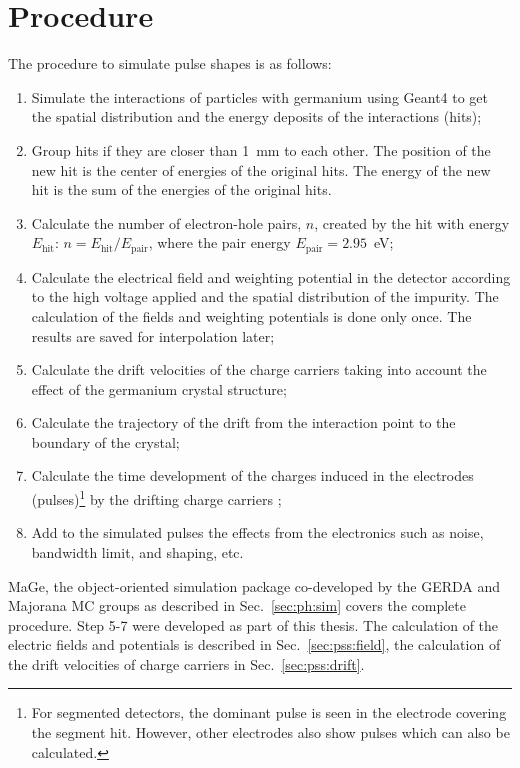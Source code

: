 \section{Procedure}
\label{sec:pss:proc}
The procedure to simulate pulse shapes \cite{agata} is as follows:
\begin{enumerate}
\item Simulate the interactions of particles with germanium using Geant4 to get the spatial distribution and the energy deposits of the interactions (hits);
\item Group hits if they are closer than 1~mm to each other. The position of the new hit is the center of energies of the original hits. The energy of the new hit is the sum of the energies of the original hits.
\item Calculate the number of electron-hole pairs, $n$, created by the hit with energy $E_{\text{hit}}$: $n = E_{\text{hit}} / E_{\text{pair}}$, where the pair energy $E_{\text{pair}} = 2.95$~eV;
\item Calculate the electrical field and weighting potential \cite{Gat82, Rad88, He00} in the detector according to the high voltage applied and the spatial distribution of the impurity. The calculation of the fields and weighting potentials is done only once. The results are saved for interpolation later;
\item Calculate the drift velocities of the charge carriers taking into account the effect of the germanium crystal structure;
\item Calculate the trajectory of the drift from the interaction point to the boundary of the crystal;
\item Calculate the time development of the charges induced in the electrodes (pulses)\footnote{For segmented detectors, the dominant pulse is seen in the electrode covering the segment hit. However, other electrodes also show pulses which can also be calculated.} by the drifting charge carriers \cite{igex}; 
\item Add to the simulated pulses the effects from the electronics such as noise, bandwidth limit, and shaping, etc.
\end{enumerate}
MaGe, the object-oriented simulation package co-developed by the GERDA and Majorana MC groups as described in Sec.~\ref{sec:ph:sim} covers the complete procedure. Step 5-7 were developed as part of this thesis. The calculation of the electric fields and potentials is described in Sec.~\ref{sec:pss:field}, the calculation of the drift velocities of charge carriers in Sec.~\ref{sec:pss:drift}.


